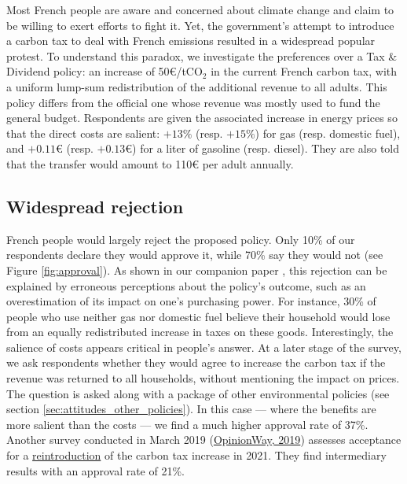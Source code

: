 \documentclass[english,5p,authoryear]{elsarticle}
\begin{document}
Most French people are aware and concerned about climate change and claim to be willing to exert efforts to fight it. Yet, the government's attempt to introduce a carbon tax to deal with French emissions resulted in a widespread popular protest. To understand this paradox, we investigate the preferences over a Tax \& Dividend policy: an increase of 50\euro{}/tCO$_2$ in the current French carbon tax, with a uniform lump-sum redistribution of the additional revenue to all adults. This policy differs from the official one whose revenue was mostly used to fund the general budget. Respondents are given the associated increase in energy prices so that the direct costs are salient: $+13\%$ (resp. $+15\%$) for gas (resp. domestic fuel), and $+0.11$\euro{} (resp. $+0.13$\euro{}) for a liter of gasoline (resp. diesel). They are also told that the transfer would amount to 110\euro{} per adult annually. %

    \subsection{Widespread rejection}

French people would largely reject the proposed policy. Only 10\% of our respondents declare they would approve it, while 70\% say they would not (see Figure \ref{fig:approval}). As shown in our companion paper \citep{douenne_can_2019}, this rejection can be explained by erroneous perceptions about the policy's outcome, such as an overestimation of its impact on one's purchasing power. For instance, 30\% of people who use neither gas nor domestic fuel believe their household would lose from an equally redistributed increase in taxes on these goods. Interestingly, the salience of costs appears critical in people's answer. At a later stage of the survey, we ask respondents whether they would agree to increase the carbon tax if the revenue was returned to all households, without mentioning the impact on prices. The question is asked along with a package of other environmental policies (see section \ref{sec:attitudes_other_policies}). In this case --- where the benefits are more salient than the costs --- we find a much higher approval rate of 37\%. Another survey conducted in March 2019 (\href{https://drive.google.com/file/d/1ne1nUsJJqY1PYFOs9dH9uK6mLw39R1QY/view}{OpinionWay, 2019}) assesses acceptance for a \uline{reintroduction} of the carbon tax increase in 2021. They find intermediary results with an approval rate of 21\%. %
\end{document}
